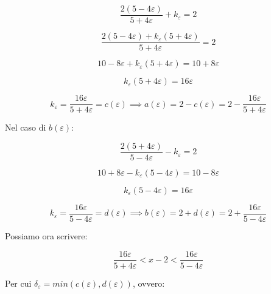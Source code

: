 \documentclass{article}
\begin{document}
\begin{equation*}
    \dfrac{2(5-4\varepsilon)}{5 + 4\varepsilon} + k_\varepsilon = 2
\end{equation*}

\begin{equation*}
    \dfrac{2(5-4\varepsilon) + k_\varepsilon(5 + 4\varepsilon)}{5 + 4\varepsilon} = 2
\end{equation*}

\begin{equation*}
    10-8\varepsilon + k_\varepsilon(5 + 4\varepsilon) = 10 + 8\varepsilon
\end{equation*}

\begin{equation*}
    k_\varepsilon(5 + 4\varepsilon) = 16\varepsilon
\end{equation*}

\begin{equation*}
    k_\varepsilon = \frac{16\varepsilon}{5 + 4\varepsilon} = c(\varepsilon) \implies a(\varepsilon) = 2 - c(\varepsilon) = 2 - \frac{16\varepsilon}{5 + 4\varepsilon}
\end{equation*}

\noindent Nel caso di $b(\varepsilon)$:

\begin{equation*}
    \frac{2(5+4\varepsilon)}{5-4\varepsilon} - k_\varepsilon = 2
\end{equation*}

\begin{equation*}
    10+8\varepsilon-k_\varepsilon(5-4\varepsilon) = 10 - 8\varepsilon
\end{equation*}

\begin{equation*}
    k_\varepsilon(5-4\varepsilon) = 16\varepsilon
\end{equation*}

\begin{equation*}
    k_\varepsilon = \frac{16\varepsilon}{5-4\varepsilon} = d(\varepsilon) \implies b(\varepsilon) = 2 + d(\varepsilon) = 2 + \frac{16\varepsilon}{5-4\varepsilon}
\end{equation*}

\noindent Possiamo ora scrivere: 

\begin{equation*}
    \frac{16\varepsilon}{5+4\varepsilon} < x - 2 < \frac{16\varepsilon}{5-4\varepsilon}
\end{equation*}

\noindent Per cui $\delta_\varepsilon = min(c(\varepsilon), d(\varepsilon))$, ovvero:
\end{document}
